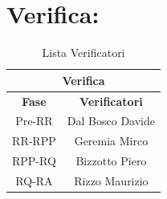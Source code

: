 \section*{\LARGE Verifica:}
\begin{table}[!h]
  \begin{center}
    \begin{tabular}
      {|c|c|}
      \hline
      \multicolumn{2}{|c|}{ \textbf{Verifica} } \\
      \hline
      \textbf{Fase} & \textbf{Verificatori} \\
      \hline
      Pre-RR & Dal Bosco Davide\\
                 
      \hline
      RR-RPP & Geremia Mirco \\
                  
      \hline
      RPP-RQ & Bizzotto Piero \\
                  
      \hline
      RQ-RA & Rizzo Maurizio \\
                  
      \hline
    \end{tabular}
    \caption{Lista Verificatori} %
    \label{tabverifica}
  \end{center}
\end{table}
 
 
